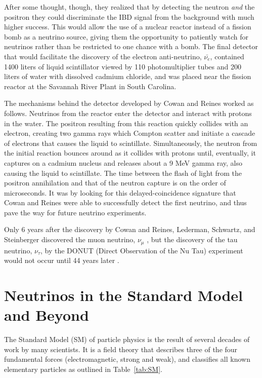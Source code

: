 After some thought, though, they realized that by detecting the neutron \textit{and} the positron they could discriminate the IBD signal from the background with much higher success. 
This would allow the use of a nuclear reactor instead of a fission bomb as a neutrino source, giving them the opportunity to patiently watch for neutrinos rather than be restricted to one chance with a bomb. 
The final detector that would facilitate the discovery of the electron anti-neutrino, $\bar{\nu_{e}}$, contained 1400 liters of liquid scintillator viewed by 110 photomultiplier tubes and 200 liters of water with dissolved cadmium chloride, and was placed near the fission reactor at the Savannah River Plant in South Carolina. 

The mechanisms behind the detector developed by Cowan and Reines worked as follows. 
Neutrinos from the reactor enter the detector and interact with protons in the water. 
The positron resulting from this reaction quickly collides with an electron, creating two gamma rays which Compton scatter and initiate a cascade of electrons that causes the liquid to scintillate. 
Simultaneously, the neutron from the initial reaction bounces around as it collides with protons until, eventually, it captures on a cadmium nucleus and releases about a 9 MeV gamma ray, also causing the liquid to scintillate. 
The time between the flash of light from the positron annihilation and that of the neutron capture is on the order of microseconds. 
It was by looking for this delayed-coincidence signature that Cowan and Reines were able to successfully detect the first neutrino, and thus pave the way for future neutrino experiments. 

Only 6 years after the discovery by Cowan and Reines, Lederman, Schwartz, and Steinberger discovered the muon neutrino, $\nu_{\mu}$ \cite{Lederman},
but the discovery of the tau neutrino, $\nu_{\tau}$, by the DONUT (Direct Observation of the Nu Tau) experiment would not occur until 44 years later \cite{TauDONUT,DONUT}.


\section{Neutrinos in the Standard Model and Beyond} \label{ch:NeutrinosInSM}

The Standard Model (SM) of particle physics is the result of several decades of work by many scientists. It is a field theory that describes three of the four fundamental forces (electromagnetic, strong and weak), and classifies all known elementary particles as outlined in Table~\ref{tab:SM}.

